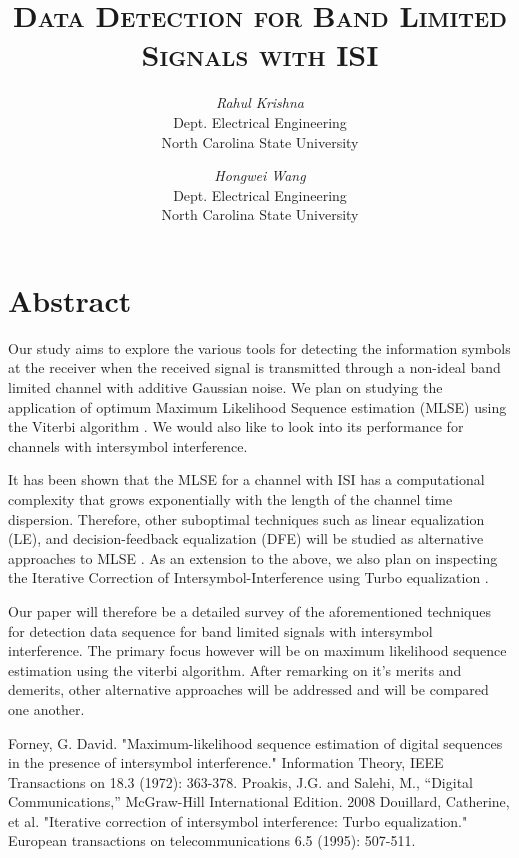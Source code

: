 \documentclass[11pt]{article}
\begin{document}
\title{\textsc{Data Detection for Band Limited Signals with ISI}}
\author{\textit{Rahul Krishna}\\Dept. Electrical Engineering\\North Carolina State University \and \textit{Hongwei Wang}\\Dept. Electrical Engineering\\North Carolina State University}
\date{}
\maketitle

\section*{Abstract}
Our study aims to explore the various tools for detecting the information symbols at the receiver when the received signal is transmitted through a non-ideal band limited channel with additive Gaussian noise. We plan on studying the application of optimum Maximum Likelihood Sequence estimation (MLSE) using the Viterbi algorithm \cite{Forney}. We would also like to look into its performance for channels with intersymbol interference.

It has been shown that the MLSE for a channel with ISI has a computational complexity that grows exponentially with the length of the channel time dispersion. Therefore, other suboptimal techniques such as linear equalization (LE), and decision-feedback equalization (DFE) will be studied as alternative approaches to MLSE \cite{Proakis}. As an extension to the above, we also plan on inspecting the Iterative Correction of Intersymbol-Interference using Turbo equalization \cite{Catherine}.

Our paper will therefore be a detailed survey of the aforementioned techniques for detection data sequence for band limited signals with intersymbol interference. The primary focus however will be on maximum likelihood sequence estimation using the viterbi algorithm. After remarking on it's merits and demerits, other alternative approaches will be addressed and will be compared one another.

\begin{thebibliography}{10}
Forney, G. David. "Maximum-likelihood sequence estimation of digital sequences in the presence of intersymbol interference." Information Theory, IEEE Transactions on 18.3 (1972): 363-378.
Proakis, J.G. and Salehi, M., ``Digital Communications,'' McGraw-Hill International Edition. 2008
Douillard, Catherine, et al. "Iterative correction of intersymbol interference: Turbo equalization." European transactions on telecommunications 6.5 (1995): 507-511.
\end{thebibliography}
\end{document}
